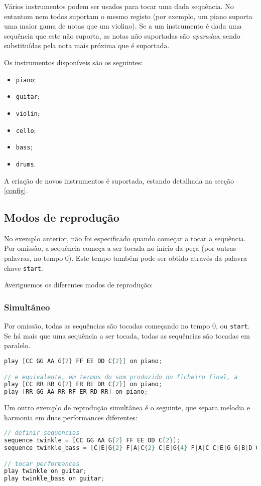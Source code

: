 \documentclass{article}
\begin{document}
Vários instrumentos podem ser usados para tocar uma dada sequência. No entantom nem todos suportam o mesmo registo (por exemplo, um piano suporta uma maior gama de notas que um violino). Se a um instrumento é dada uma sequência que este não suporta, as notas não suportadas são \textit{aparadas}, sendo substituídas pela nota mais próxima que é suportada. 

Os instrumentos disponíveis são os seguintes:
\begin{itemize}
    \item \texttt{piano};
    \item \texttt{guitar};
    \item \texttt{violin};
    \item \texttt{cello};
    \item \texttt{bass};
    \item \texttt{drums}.
\end{itemize}
A criação de novos instrumentos é suportada, estando detalhada na secção \ref{config}.

\subsection{Modos de reprodução}
No exemplo anterior, não foi especificado quando começar a tocar a sequência. Por omissão, a sequência começa a ser tocada no início da peça (por outras palavras, no tempo 0). Este tempo também pode ser obtido através da palavra chave \texttt{start}.

Averiguemos os diferentes modos de reprodução:

\subsubsection{Simultâneo}
Por omissão, todas as sequências são tocadas começando no tempo 0, ou \texttt{start}. Se há mais que uma sequência a ser tocada, todas as sequências são tocadas em paralelo.

\begin{lstlisting}[language=C]
play [CC GG AA G{2} FF EE DD C{2}] on piano;

// e equivalente, em termos do som produzido no ficheiro final, a
play [CC RR RR G{2} FR RE DR C{2}] on piano;
play [RR GG AA RR RF ER RD RR] on piano;
\end{lstlisting}

Um outro exemplo de reprodução simultânea é o seguinte, que separa melodia e harmonia em duas performances diferentes:
\begin{lstlisting}[language=C]
// definir sequencias
sequence twinkle = [CC GG AA G{2} FF EE DD C{2}];
sequence twinkle_bass = [C|E|G{2} F|A|C{2} C|E|G{4} F|A|C C|E|G G|B|D C|E|G];

// tocar performances
play twinkle on guitar;
play twinkle_bass on guitar;
\end{lstlisting}
\end{document}
